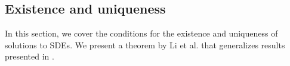 \documentclass[12pt]{article}
\newtheorem{theorem}{Theorem}[section]
\theoremstyle{definition}
\numberwithin{equation}{section}
\newcommand{\R}{\mathbb{R}}
\newcommand{\ev}[1]{\mathbb{E}\left[{#1}\right]}
\begin{document}
\subsection{Existence and uniqueness}
\label{subsec:sde_existence_uniqueness}
In this section, we cover the conditions for the existence and uniqueness of solutions to SDEs. We present a theorem by Li et al. \cite{liStochasticModifiedEquations2019} that generalizes results presented in \cite{oksendalStochasticDifferentialEquations2003}. 
\end{document}
